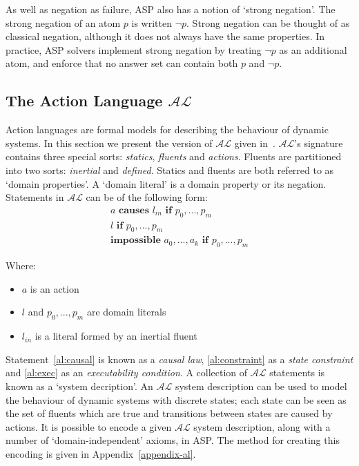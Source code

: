 \documentclass[../interim.tex]{subfiles}
\begin{document}
As well as negation as failure, ASP also has a notion of `strong negation'. The strong negation of an atom $p$ is written $\neg p$. Strong negation can be thought of as classical negation, although it does not always have the same properties. In practice, ASP solvers implement strong negation by treating $\neg p$ as an additional atom, and enforce that no answer set can contain both $p$ and $\neg p$.

\subsection{The Action Language $\mathcal{AL}$}

Action languages are formal models for describing the behaviour of dynamic systems. In this section we present the version of $\mathcal{AL}$ given in~\cite{krr-asp-book}. $\mathcal{AL}$'s signature contains three special sorts: \textit{statics}, \textit{fluents} and \textit{actions}. Fluents are partitioned into two sorts: \textit{inertial} and \textit{defined}. Statics and fluents are both referred to as `domain properties'. A `domain literal' is a domain property or its negation. Statements in $\mathcal{AL}$ can be of the following form:
\begin{gather}
  a \textbf{ causes } l_{in} \textbf{ if } p_0,...,p_m \label{al:causal} \\
  l \textbf{ if } p_0,...,p_m \label{al:constraint} \\
  \textbf{impossible } a_0,...,a_k \textbf{ if } p_0,...,p_m \label{al:exec}
\end{gather}
\noindent
{\footnotesize Where:
\vspace{-0.8em}
\renewcommand{\labelitemi}{$\textendash$}
\begin{itemize}
  \setlength\itemsep{-0.4em}
  \item $a$ is an action
  \item $l$ and $p_0,...,p_m$ are domain literals
  \item $l_{in}$ is a literal formed by an inertial fluent \\
\end{itemize}}

Statement~\ref{al:causal} is known as a \textit{causal law}, \ref{al:constraint} as a \textit{state constraint} and \ref{al:exec} as an \textit{executability condition}. A collection of $\mathcal{AL}$ statements is known as a `system decription'. An $\mathcal{AL}$ system description can be used to model the behaviour of dynamic systems with discrete states; each state can be seen as the set of fluents which are true and transitions between states are caused by actions. It is possible to encode a given $\mathcal{AL}$ system description, along with a number of `domain-independent' axioms, in ASP. The method for creating this encoding is given in Appendix~\ref{appendix-al}.
\end{document}
